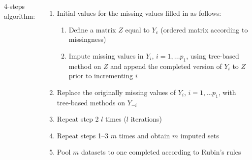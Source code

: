 \documentclass[20pt,margin=1in,innermargin=-4.5in,blockverticalspace=-0.25in]{tikzposter}
\begin{document}
\begin{columns}
{  %

    
    4-steps algorithm:
    \vspace{-0.5em}
    \begin{enumerate}
        \item Initial values for the missing values filled in as follows:
        \vspace{-0.5em}
        \begin{enumerate}
            \item Define a matrix $Z$ equal to $Y_c$ (ordered matrix according to missingness)
            \vspace{-0.25em}
            \item Impute missing values in $Y_i$, $i=1, ... p_1$, using tree-based method on $Z$ and append the completed version of $Y_i$ to $Z$ prior to incrementing $i$             
        \end{enumerate}
    \vspace{-1em}
    \item  Replace the originally missing values of $Y_i$, $i=1, ... p_1$, with tree-based methods on $Y_{-i}$
    \vspace{-0.5em}
    \item Repeat step 2 $l$  times ($l$  iterations)
    \vspace{-0.5em}          
    \item Repeat steps 1–3 $m$ times and obtain $m$ imputed sets
    \vspace{-0.5em}
    \item Pool $m$ datasets to one completed according to Rubin’s rules  
    \end{enumerate}  
    \vspace{-1em}
}


\end{columns}
\end{document}
